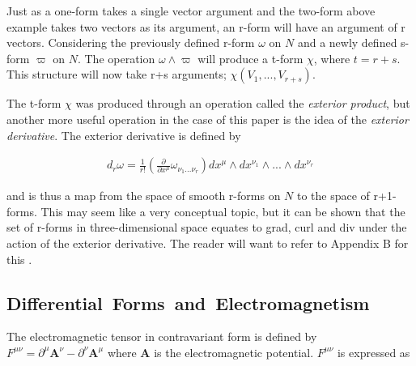 \documentclass[fleqn, twocolumn, 10pt]{article}
\begin{document}
Just as a one-form takes a single vector argument and the two-form above example takes two vectors as its argument, an r-form will have an argument of r vectors. Considering the previously defined r-form $\omega$ on $N$ and a newly defined s-form $\varpi$ on $N$. The operation $\omega \land \varpi$ will produce a t-form $\chi$, where $t = r+s$. This structure will now take r+s arguments; $\chi(V_1, ... , V_{r+s})$. 

The t-form $\chi$ was produced through an operation called the \textit{exterior product}, but another more useful operation in the case of this paper is the idea of the \textit{exterior derivative}. The exterior derivative is defined by

\begin{ceqn}
\begin{align*}
d_r\omega = \frac{1}{r!}\left(\frac{\partial}{\partial x^\mu}\omega_{\nu_1...\nu_r}\right) dx^\mu \land dx^{\nu_1} \land ... \land dx^{\nu_r}
\end{align*}
\end{ceqn}
and is thus a map from the space of smooth r-forms on $N$ to the space of r+1-forms. This may seem like a very conceptual topic, but it can be shown that the set of r-forms in three-dimensional space equates to grad, curl and div under the action of the exterior derivative. The reader will want to refer to Appendix B for this \cite{shnir, nakahara2003geometry, kai2015lam}.


\subsection{\!\!\!\mbox{Differential Forms and \!Electromagnetism}}

The electromagnetic tensor in contravariant form is defined by $F^{\mu\nu} = \partial^\mu \mathbf{A}^\nu - \partial^\nu \mathbf{A}^\mu$ where $\mathbf{A}$ is the electromagnetic potential. $F^{\mu\nu}$ is expressed as
\end{document}
